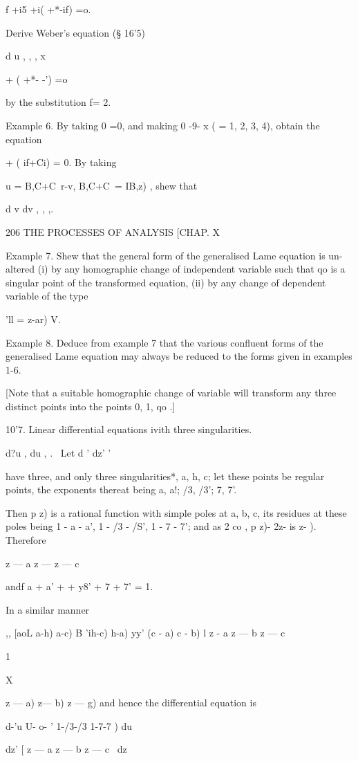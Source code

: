 f +i5 +i( +*-if) =o.

Derive Weber's equation (§ 16'5)

d u , , , x

  + ( +*- -') =o

by the substitution f= 2.

Example 6. By taking 0 =0, and making 0 -9- x ( = 1, 2, 3, 4), obtain
the equation

  + ( if+Ci) = 0. By taking

u = B,C+C\ r-v, B,C+C\ = IB,z) , shew that

 d v dv , , ,.

206 THE PROCESSES OF ANALYSIS [CHAP. X

Example 7. Shew that the general form of the generalised Lame equation
is un- altered (i) by any homographic change of independent variable
such that qo is a singular point of the transformed equation, (ii) by
any change of dependent variable of the type

'll = z-ar) V.

Example 8. Deduce from example 7 that the various confluent forms of
the generalised Lame equation may always be reduced to the forms given
in examples 1-6.

[Note that a suitable homographic change of variable will transform
any three distinct points into the points 0, 1, qo .]

10'7. Linear differential equations ivith three singularities.

d?u , du , . \ Let d ' dz' '

have three, and only three singularities*, a, h, c; let these points
be regular points, the exponents thereat being a, a!; /3, /3'; 7,
7'.

Then p z) is a rational function with simple poles at a, b, c, its
residues at these poles being 1 - a - a', 1 - /3 - /S', 1 - 7 - 7';
and as 2 co , p z)- 2z- is z- ). Therefore

  z — a z — z — c

andf a + a' + + y8' + 7 + 7' = 1.

In a similar manner

,, [aoL a-h) a-c) B 'ih-c) h-a) yy' (c - a) c - b) l z - a z — b z — c

1

X

 z — a) z— b) z — g) and hence the differential equation is

d-'u U- o- ' 1-/3-/3 1-7-7 ) du

dz' [ z — a z — b z — c \ dz

